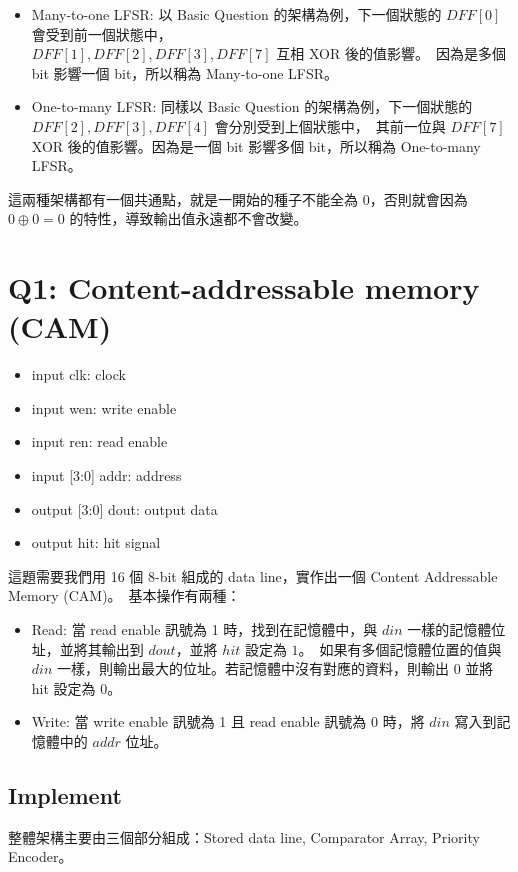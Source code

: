 \documentclass[10.5pt,compsoc,UTF8]{CjC}
\theoremstyle{mystyle}
\begin{document}
\begin{itemize}
  \item Many-to-one LFSR: 以 Basic Question 的架構為例，下一個狀態的 $DFF[0]$ 會受到前一個狀態中，\\
  $DFF[1], DFF[2], DFF[3], DFF[7]$ 互相 XOR 後的值影響。\
  因為是多個 bit 影響一個 bit，所以稱為 Many-to-one LFSR。
  \item One-to-many LFSR: 同樣以 Basic Question 的架構為例，下一個狀態的 $DFF[2], DFF[3], DFF[4]$ 會分別受到上個狀態中，\
  其前一位與 $DFF[7]$ XOR 後的值影響。因為是一個 bit 影響多個 bit，所以稱為 One-to-many LFSR。
\end{itemize}

這兩種架構都有一個共通點，就是一開始的種子不能全為 0，否則就會因為 $0 \oplus 0 = 0$ 的特性，導致輸出值永遠都不會改變。

\section{Q1: Content-addressable memory (CAM)}

\begin{itemize}
  \item input clk: clock
  \item input wen: write enable
  \item input ren: read enable
  \item input [3:0] addr: address
  \item output [3:0] dout: output data
  \item output hit: hit signal
\end{itemize}

這題需要我們用 16 個 8-bit 組成的 data line，實作出一個 Content Addressable Memory (CAM)。\
基本操作有兩種：

\begin{itemize}
  \item Read: 當 read enable 訊號為 1 時，找到在記憶體中，與 $din$ 一樣的記憶體位址，並將其輸出到 $dout$，並將 $hit$ 設定為 $1$。\
  如果有多個記憶體位置的值與 $din$ 一樣，則輸出最大的位址。若記憶體中沒有對應的資料，則輸出 $0$ 並將 hit 設定為 $0$。
  \item Write: 當 write enable 訊號為 1 且 read enable 訊號為 0 時，將 $din$ 寫入到記憶體中的 $addr$ 位址。
\end{itemize}

\subsection{Implement}
整體架構主要由三個部分組成：Stored data line, Comparator Array, Priority Encoder。
\end{document}
